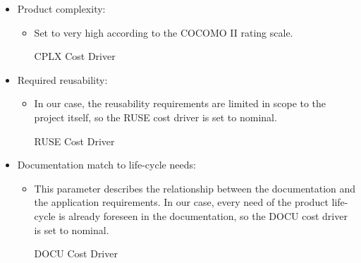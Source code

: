\begin{itemize}
	\item Product complexity: 
	\begin{itemize}
	\item[] Set to very high according to the COCOMO II rating scale.
	\begin{costdriverstable}{CPLX Cost Driver}
	\end{costdriverstable}
	\end{itemize}
\end{itemize}

\begin{itemize}
	\item Required reusability: 
	\begin{itemize}
	\item[] In our case, the reusability requirements are limited in scope to the project itself, so the RUSE cost driver is set to nominal.
	\begin{costdriverstable}{RUSE Cost Driver}
		\hline
	\end{costdriverstable}
	\end{itemize}
\end{itemize}

\begin{itemize}
	\item Documentation match to life-cycle needs: 
	\begin{itemize}
	\item[] This parameter describes the relationship between the  documentation and the application requirements. In our case, every need of the product life-cycle is already foreseen in the documentation, so the DOCU cost driver is set to nominal.
	\begin{costdriverstable}{DOCU Cost Driver}
		\hline
	\end{costdriverstable}
	\end{itemize}
\end{itemize}

